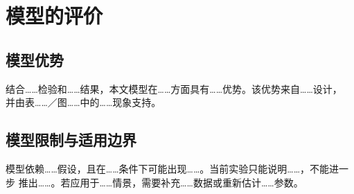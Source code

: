 
\section{模型的评价}

\subsection{模型优势}

结合……检验和……结果，本文模型在……方面具有……优势。该优势来自……设计，
并由表……／图……中的……现象支持。

\subsection{模型限制与适用边界}

模型依赖……假设，且在……条件下可能出现……。当前实验只能说明……，不能进一步
推出……。若应用于……情景，需要补充……数据或重新估计……参数。

